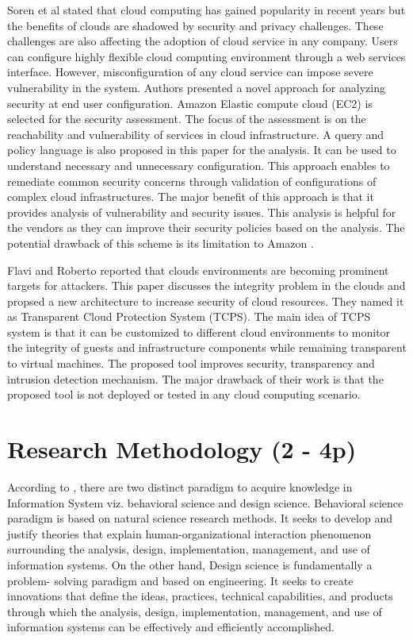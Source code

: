 \documentclass[a4paper,twoside,10pt]{report}
\begin{document}
Soren et al \cite{Bleikertz:2010:SAM:1866835.1866853} stated that cloud computing has gained popularity in recent years but the benefits of clouds are shadowed by security and privacy challenges. These challenges are also affecting the adoption of cloud service in any company. Users can configure highly flexible cloud computing environment through a web services interface. However, misconfiguration of any cloud service can impose severe vulnerability in the system. Authors presented a novel approach for analyzing security at end user configuration. Amazon Elastic compute cloud (EC2) is selected for the security assessment. The focus of the assessment is on the reachability and vulnerability of services in cloud infrastructure. A query and policy language is also proposed in this paper for the analysis. It can be used to understand necessary and unnecessary configuration. This approach enables to remediate common security concerns through validation of configurations of complex cloud infrastructures. The major benefit of this approach is that it provides analysis of vulnerability and security issues. This analysis is helpful for the vendors as they can improve their security policies based on the analysis. The potential drawback of this scheme is its limitation to Amazon \cite{6148380}.

Flavi and Roberto \cite{Lombardi:2010:TSC:1774088.1774176} reported that clouds environments are becoming prominent targets for attackers. This paper discusses the integrity problem in the clouds and propsed a new architecture to increase security of cloud resources. They named it as Transparent Cloud Protection System (TCPS). The main idea of TCPS system is that it can be customized to different cloud environments to monitor the integrity of guests and infrastructure components while remaining transparent to virtual machines. The proposed tool improves security, transparency and intrusion detection mechanism. The major drawback of their work is that the proposed tool is not deployed or tested in any cloud computing scenario.

\chapter{Research Methodology (2 - 4p)}\label{ResMethod}

According to \cite{Hevner:2004:DSI:2017212.2017217}, there are two distinct paradigm to acquire knowledge in Information System viz. behavioral science and design science. Behavioral science paradigm is based on natural science research methods. It seeks to develop and justify theories that explain human-organizational interaction phenomenon surrounding the analysis, design, implementation, management, and use of information systems. On the other hand, Design science is fundamentally a problem- solving paradigm and based on engineering. It seeks to create innovations that define the ideas, practices, technical capabilities, and products through which the analysis, design, implementation, management, and use of information systems can be effectively and efficiently accomplished.
\end{document}
